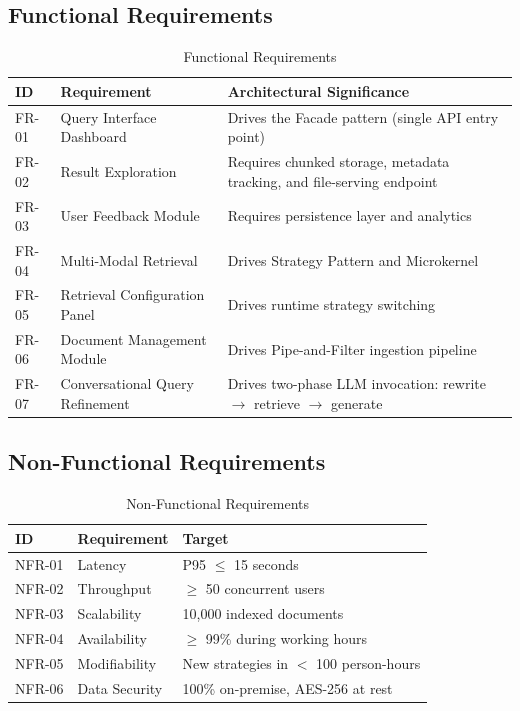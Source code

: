 \documentclass[11pt,a4paper]{article}
\begin{document}
\subsection{Functional Requirements}

\begin{table}[H]
\centering
\small
\begin{tabularx}{\textwidth}{llX}
\toprule
\textbf{ID} & \textbf{Requirement} & \textbf{Architectural Significance} \\
\midrule
FR-01 & Query Interface Dashboard & Drives the Facade pattern (single API entry point) \\
FR-02 & Result Exploration & Requires chunked storage, metadata tracking, and file-serving endpoint \\
FR-03 & User Feedback Module & Requires persistence layer and analytics \\
FR-04 & Multi-Modal Retrieval & Drives Strategy Pattern and Microkernel \\
FR-05 & Retrieval Configuration Panel & Drives runtime strategy switching \\
FR-06 & Document Management Module & Drives Pipe-and-Filter ingestion pipeline \\
FR-07 & Conversational Query Refinement & Drives two-phase LLM invocation: rewrite $\to$ retrieve $\to$ generate \\
\bottomrule
\end{tabularx}
\caption{Functional Requirements}
\end{table}

\subsection{Non-Functional Requirements}

\begin{table}[H]
\centering
\begin{tabular}{lll}
\toprule
\textbf{ID} & \textbf{Requirement} & \textbf{Target} \\
\midrule
NFR-01 & Latency & P95 $\leq$ 15 seconds \\
NFR-02 & Throughput & $\geq$ 50 concurrent users \\
NFR-03 & Scalability & 10,000 indexed documents \\
NFR-04 & Availability & $\geq$ 99\% during working hours \\
NFR-05 & Modifiability & New strategies in $<$ 100 person-hours \\
NFR-06 & Data Security & 100\% on-premise, AES-256 at rest \\
\bottomrule
\end{tabular}
\caption{Non-Functional Requirements}
\end{table}
\end{document}
